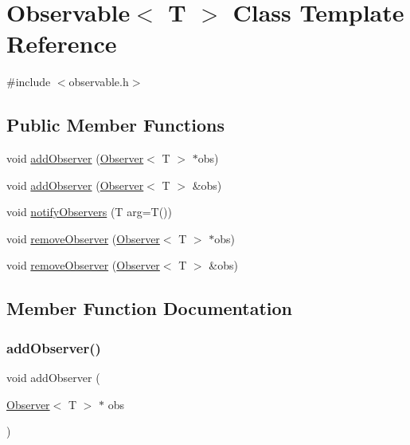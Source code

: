 \hypertarget{classObservable}{}\section{Observable$<$ T $>$ Class Template Reference}
\label{classObservable}


{\ttfamily \#include $<$observable.\+h$>$}

\subsection*{Public Member Functions}
\begin{DoxyCompactItemize}
\item 
void \mbox{\hyperlink{classObservable_a7fa6df797eb4680c2776371f2937a1b2}{add\+Observer}} (\mbox{\hyperlink{classObserver}{Observer}}$<$ T $>$ $\ast$obs)
\item 
void \mbox{\hyperlink{classObservable_a49fbc8dd9a3300429f7f575dc7ba0be8}{add\+Observer}} (\mbox{\hyperlink{classObserver}{Observer}}$<$ T $>$ \&obs)
\item 
void \mbox{\hyperlink{classObservable_a337380718b992689248fac2927145c62}{notify\+Observers}} (T arg=T())
\item 
void \mbox{\hyperlink{classObservable_a2fbb493a74c7c4a7604326bffcd75dbd}{remove\+Observer}} (\mbox{\hyperlink{classObserver}{Observer}}$<$ T $>$ $\ast$obs)
\item 
void \mbox{\hyperlink{classObservable_a36b9c4607c1cab08dc800daa5aa38b82}{remove\+Observer}} (\mbox{\hyperlink{classObserver}{Observer}}$<$ T $>$ \&obs)
\end{DoxyCompactItemize}


\subsection{Member Function Documentation}
\mbox{\label{classObservable_a7fa6df797eb4680c2776371f2937a1b2}} 
\subsubsection{\texorpdfstring{add\+Observer()}{addObserver()}\hspace{0.1cm}{\footnotesize\ttfamily [1/2]}}
{\footnotesize\ttfamily void add\+Observer (\begin{DoxyParamCaption}\item[{\mbox{\hyperlink{classObserver}{Observer}}$<$ T $>$ $\ast$}]{obs }\end{DoxyParamCaption})}

